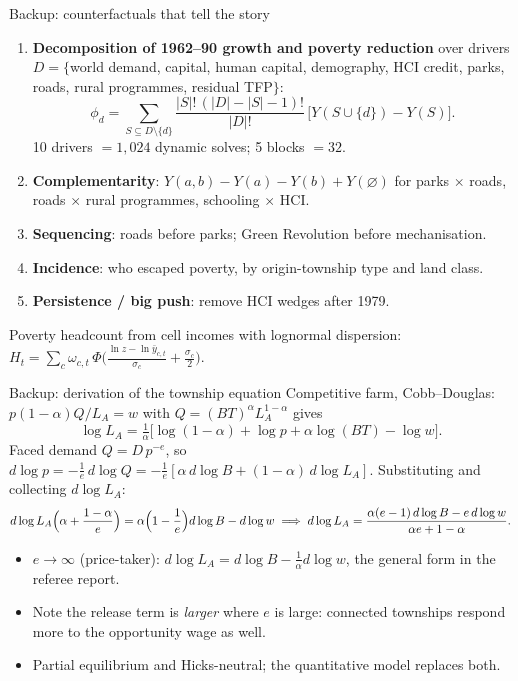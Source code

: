 \documentclass[10pt,aspectratio=169]{beamer}
\begin{document}
\begin{frame}{Backup: counterfactuals that tell the story}
  \small
  \begin{enumerate}
    \item \textbf{Decomposition of 1962--90 growth and poverty reduction} over drivers
          $D=\{$world demand, capital, human capital, demography, HCI credit, parks, roads,
          rural programmes, residual TFP$\}$:
          \begin{equation*}
            \phi_d=\sum_{S\subseteq D\setminus\{d\}}\frac{|S|!\,(|D|-|S|-1)!}{|D|!}\,
            \bigl[Y(S\cup\{d\})-Y(S)\bigr].
          \end{equation*}
          10 drivers $=1{,}024$ dynamic solves; 5 blocks $=32$.
    \item \textbf{Complementarity}: $Y(a,b)-Y(a)-Y(b)+Y(\varnothing)$ for parks $\times$
          roads, roads $\times$ rural programmes, schooling $\times$ HCI.
    \item \textbf{Sequencing}: roads before parks; Green Revolution before mechanisation.
    \item \textbf{Incidence}: who escaped poverty, by origin-township type and land class.
    \item \textbf{Persistence / big push}: remove HCI wedges after 1979.
  \end{enumerate}
  Poverty headcount from cell incomes with lognormal dispersion:
  $H_t=\sum_c\omega_{c,t}\,\Phi\bigl(\frac{\ln z-\ln\bar y_{c,t}}{\sigma_c}+\frac{\sigma_c}{2}\bigr)$.
\end{frame}

\begin{frame}{Backup: derivation of the township equation}
  \small
  Competitive farm, Cobb--Douglas: $p(1-\alpha)Q/L_A=w$ with $Q=(BT)^\alpha L_A^{1-\alpha}$
  gives
  \begin{equation*}
    \log L_A=\tfrac1\alpha\bigl[\log(1-\alpha)+\log p+\alpha\log(BT)-\log w\bigr].
  \end{equation*}
  Faced demand $Q=D\,p^{-e}$, so $d\log p=-\frac1e\,d\log Q=-\frac1e[\alpha\,d\log B+(1-\alpha)\,d\log L_A]$.
  Substituting and collecting $d\log L_A$:
  \begin{equation*}
    d\log L_A\Bigl(\alpha+\frac{1-\alpha}{e}\Bigr)=\alpha\Bigl(1-\frac1e\Bigr)d\log B-d\log w
    \;\Longrightarrow\;
    d\log L_A=\frac{\alpha(e-1)\,d\log B-e\,d\log w}{\alpha e+1-\alpha}.
  \end{equation*}
  \begin{itemize}
    \item $e\to\infty$ (price-taker): $d\log L_A=d\log B-\frac1\alpha d\log w$, the
          general form in the referee report.
    \item Note the release term is \emph{larger} where $e$ is large: connected townships
          respond more to the opportunity wage as well.
    \item Partial equilibrium and Hicks-neutral; the quantitative model replaces both.
  \end{itemize}
\end{frame}
\end{document}
